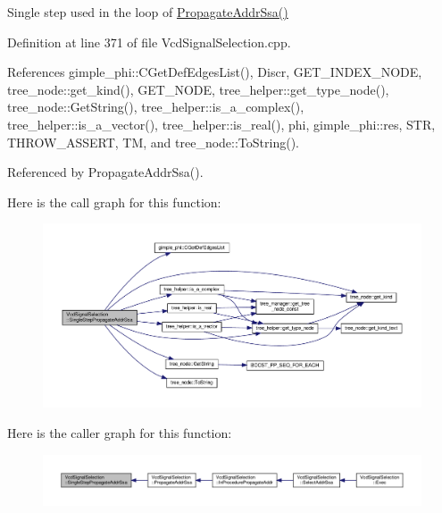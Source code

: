 Single step used in the loop of \hyperlink{classVcdSignalSelection_a2c6b3c717e45415bbd12fa5f82401b58}{Propagate\+Addr\+Ssa()} 



Definition at line 371 of file Vcd\+Signal\+Selection.\+cpp.



References gimple\+\_\+phi\+::\+C\+Get\+Def\+Edges\+List(), Discr, G\+E\+T\+\_\+\+I\+N\+D\+E\+X\+\_\+\+N\+O\+DE, tree\+\_\+node\+::get\+\_\+kind(), G\+E\+T\+\_\+\+N\+O\+DE, tree\+\_\+helper\+::get\+\_\+type\+\_\+node(), tree\+\_\+node\+::\+Get\+String(), tree\+\_\+helper\+::is\+\_\+a\+\_\+complex(), tree\+\_\+helper\+::is\+\_\+a\+\_\+vector(), tree\+\_\+helper\+::is\+\_\+real(), phi, gimple\+\_\+phi\+::res, S\+TR, T\+H\+R\+O\+W\+\_\+\+A\+S\+S\+E\+RT, TM, and tree\+\_\+node\+::\+To\+String().



Referenced by Propagate\+Addr\+Ssa().

Here is the call graph for this function\+:
\nopagebreak
\begin{figure}[H]
\begin{center}
\leavevmode
\includegraphics[width=350pt]{dd/de4/classVcdSignalSelection_ae525accf24ad365699762d821c108804_cgraph}
\end{center}
\end{figure}
Here is the caller graph for this function\+:
\nopagebreak
\begin{figure}[H]
\begin{center}
\leavevmode
\includegraphics[width=350pt]{dd/de4/classVcdSignalSelection_ae525accf24ad365699762d821c108804_icgraph}
\end{center}
\end{figure}
\mbox{\label{classVcdSignalSelection_aab4caffd80c85ef0629242c2602b0780}} 
